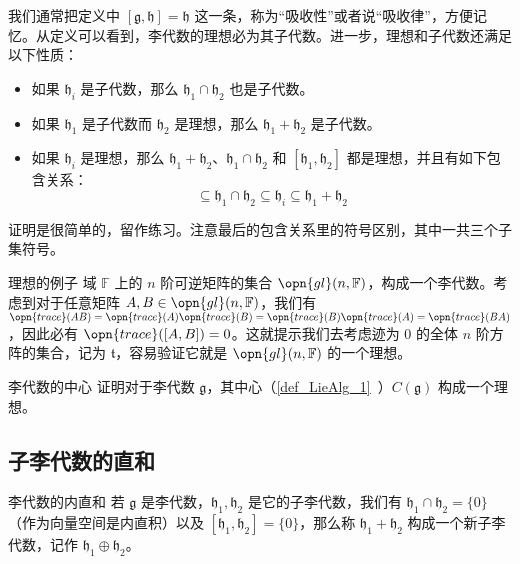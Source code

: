 我们通常把定义中 $[\mathfrak{g}, \mathfrak{h}]=\mathfrak{h}$ 这一条，称为“吸收性”或者说“吸收律”，方便记忆。从定义可以看到，李代数的理想必为其子代数。进一步，理想和子代数还满足以下性质：

\begin{itemize}
\item 如果 $\mathfrak{h}_i$ 是子代数，那么 $\mathfrak{h}_1\cap\mathfrak{h}_2$ 也是子代数。
\item 如果 $\mathfrak{h}_1$ 是子代数而 $\mathfrak{h}_2$ 是理想，那么 $\mathfrak{h}_1+\mathfrak{h}_2$ 是子代数。
\item 如果 $\mathfrak{h}_i$ 是理想，那么 $\mathfrak{h}_1+\mathfrak{h}_2$、$\mathfrak{h}_1\cap\mathfrak{h}_2$ 和 $[\mathfrak{h}_1, \mathfrak{h}_2]$ 都是理想，并且有如下包含关系：\begin{equation}
[\mathfrak{h}_1, \mathfrak{h}_2]\subseteq\mathfrak{h}_1\cap\mathfrak{h}_2\subseteq\mathfrak{h}_i\subseteq\mathfrak{h}_1+\mathfrak{h}_2
\end{equation}

\end{itemize}

证明是很简单的，留作练习。注意最后的包含关系里的符号区别，其中一共三个子集符号。

\begin{example}{理想的例子}
域 $\mathbb{F}$ 上的 $n$ 阶可逆矩阵的集合 $\opn{gl}(n, \mathbb{F})$，构成一个李代数。考虑到对于任意矩阵 $A, B\in\opn{gl}(n, \mathbb{F})$，我们有 $\opn{trace}(AB)=\opn{trace}(A)\opn{trace}(B)=\opn{trace}(B)\opn{trace}(A)=\opn{trace}(BA)$，因此必有 $\opn{trace}([A, B])=0$。这就提示我们去考虑迹为 $0$ 的全体 $n$ 阶方阵的集合，记为 $\mathfrak{t}$，容易验证它就是 $\opn{gl}(n, \mathbb{F})$ 的一个理想。
\end{example}

\begin{exercise}{李代数的中心}
证明对于李代数 $\mathfrak{g}$，其中心（\autoref{def_LieAlg_1}~）$C(\mathfrak{g})$ 构成一个理想。
\end{exercise}


\subsection{子李代数的直和}

\begin{definition}{李代数的内直和}
若 $\mathfrak{g}$ 是李代数，$\mathfrak{h}_1, \mathfrak{h}_2$ 是它的子李代数，我们有 $\mathfrak{h}_1 \cap \mathfrak{h}_2 = \{0\}$（作为向量空间是内直积）以及 $[\mathfrak{h}_1, \mathfrak{h}_2] = \{0\}$，那么称 $\mathfrak{h}_1 + \mathfrak{h}_2$ 构成一个新子李代数，记作 $\mathfrak{h}_1 \oplus \mathfrak{h}_2$。
\end{definition}

